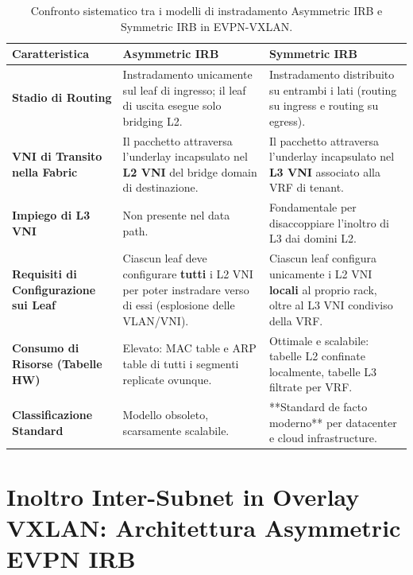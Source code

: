 \documentclass[11pt, a4paper]{article}
\begin{document}
\begin{table}[H]
\centering
\small
\renewcommand{\arraystretch}{1.4}
\begin{tabularx}{\textwidth}{|p{3.5cm}|X|X|}
\hline
\textbf{Caratteristica} & \textbf{Asymmetric IRB} & \textbf{Symmetric IRB} \\ \hline
\textbf{Stadio di Routing} & Instradamento unicamente sul leaf di ingresso; il leaf di uscita esegue solo bridging L2. & Instradamento distribuito su entrambi i lati (routing su ingress e routing su egress). \\ \hline
\textbf{VNI di Transito nella Fabric} & Il pacchetto attraversa l'underlay incapsulato nel \textbf{L2 VNI} del bridge domain di destinazione. & Il pacchetto attraversa l'underlay incapsulato nel \textbf{L3 VNI} associato alla VRF di tenant. \\ \hline
\textbf{Impiego di L3 VNI} & Non presente nel data path. & Fondamentale per disaccoppiare l'inoltro di L3 dai domini L2. \\ \hline
\textbf{Requisiti di Configurazione sui Leaf} & Ciascun leaf deve configurare \textbf{tutti} i L2 VNI per poter instradare verso di essi (esplosione delle VLAN/VNI). & Ciascun leaf configura unicamente i L2 VNI \textbf{locali} al proprio rack, oltre al L3 VNI condiviso della VRF. \\ \hline
\textbf{Consumo di Risorse (Tabelle HW)} & Elevato: MAC table e ARP table di tutti i segmenti replicate ovunque. & Ottimale e scalabile: tabelle L2 confinate localmente, tabelle L3 filtrate per VRF. \\ \hline
\textbf{Classificazione Standard} & Modello obsoleto, scarsamente scalabile. & **Standard de facto moderno** per datacenter e cloud infrastructure. \\ \hline
\end{tabularx}
\caption{Confronto sistematico tra i modelli di instradamento Asymmetric IRB e Symmetric IRB in EVPN-VXLAN.}
\end{table}

\newpage

\section{Inoltro Inter-Subnet in Overlay VXLAN: Architettura Asymmetric EVPN IRB}
\end{document}

